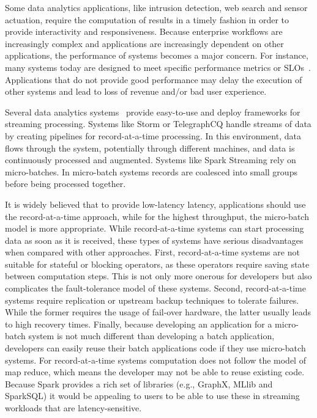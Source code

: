 Some data analytics applications, like intrusion detection, web search and sensor actuation, require the computation of results in a timely fashion in order to provide interactivity and responsiveness. 
Because enterprise workflows are increasingly complex and applications are increasingly dependent on other applications, the performance of systems becomes a major concern.
For instance, many systems today are designed to meet specific performance metrics or SLOs~\cite{Jockey}.
Applications that do not provide good performance may delay the execution of other systems and lead to loss of revenue and/or bad user experience.

Several data analytics 
systems~\cite{Babu:2001:CQO:603867.603884,TelegraphCQ,Storm,SparkStreaming,Trill,Naiad,Niagara,StreamInsight,Carney:2002:MSN:1287369.1287389,Sullivan:1998:TSM:1268256.1268258,condie2010mapreduce,Brito:2011:SLD:2114498.2116192} 
provide easy-to-use and deploy frameworks for streaming processing.
Systems like Storm or TelegraphCQ handle streams of data by creating pipelines for record-at-a-time processing. In this environment, data flows through the system, potentially through different machines, and data is continuously processed and augmented.
Systems like Spark Streaming rely on micro-batches. In micro-batch systems records are coalesced into small groups before being processed together.

It is widely believed that to provide low-latency latency, applications should use the record-at-a-time approach, while for the highest throughput, the micro-batch model is more appropriate. 
While record-at-a-time systems can start processing data as soon as it is received, these types of systems have serious disadvantages when compared with other approaches.
First, record-at-a-time systems are not suitable for stateful or blocking operators, as these operators require saving state between computation steps. This is not only more onerous for developers but also complicates the fault-tolerance model of these systems.
Second, record-at-a-time systems require replication or upstream backup techniques to tolerate failures.
While the former requires the usage of fail-over hardware, the latter usually leads to high recovery times.
Finally, because developing an application for a micro-batch system is not much different than developing a batch application, developers can easily reuse their batch applications code if they use micro-batch systems. For record-at-a-time systems computation does not follow the model of map reduce, which means the developer may not be able to reuse existing code.
Because Spark provides a rich set of libraries (e.g., GraphX, MLlib and SparkSQL) it would be appealing to users to be able to use these in streaming workloads that are latency-sensitive.

